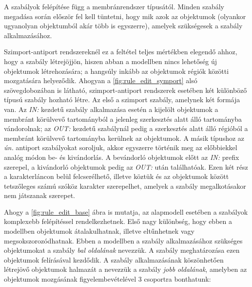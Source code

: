  A szabályok felépítése függ a membránrendszer típusától. Minden szabály megadása során először fel kell tüntetni, hogy mik azok az objektumok (olyankor ugyanolyan objektumból akár több is egyszerre), amelyek szükségesek a szabály alkalmazásához. 

Szimport-antiport rendszereknél ez a feltétel teljes mértékben elegendő ahhoz, hogy a szabály létrejöjjön, hiszen abban a modellben nincs lehetőség új objektumok létrehozására; a hangsúly inkább az objektumok régiók közötti mozgatására helyeződik. Ahogyan a \ref{fig:rule_edit_symport} alsó szövegdobozában is látható, szimport-antiport rendszerek esetében két különböző típusú szabály hozható létre. Az első a szimport szabály, amelynek két formája van. Az \textit{IN:} kezdetű szabály alkalmazása esetén a kijelölt objektumok a membránt körülvevő tartományból a jelenleg szerkesztés alatt álló tartományba vándorolnak; az \textit{OUT:} kezdetű szabálynál pedig a szerkesztés alatt álló régióból a membránt körülvevő tartományba kerülnek az objektumok. A másik típushoz az \textit{ún.} antiport szabályokat soroljuk, akkor egyszerre történik meg az előbbiekkel analóg módon be- és kivándorlás. A bevándorló objektumok előtt az \textit{IN:} prefix szerepel, a kivándorló objektumok pedig az \textit{OUT:} után találhatóak. Ezen két rész a karakterláncon belül felcserélhető, illetve köztük és az objektumok között tetszőleges számú szóköz karakter szerepelhet, amelyek a szabály megalkotásakor nem játszanak szerepet.

Ahogy a \ref{fig:rule_edit_base} ábra is mutatja, az alapmodell esetében a szabályok komplexebb felépítéssel rendelkezhetnek. Első nagy különbség, hogy ebben a modellben objektumok átalakulhatnak, illetve eltűnhetnek vagy megsokszorozódhatnak. Ebben a modellben a szabály alkalmazásához szükséges objektumokat a szabály \textit{bal oldalának} nevezzük. A szabály meghatározása ezen objektumok felírásával kezdődik. A szabály alkalmazásának köszönhetően létrejövő objektumok halmazát a nevezzük a szabály \textit{jobb oldalának}, amelyben az objektumok mozgásának figyelembevételével 3 csoportra bonthatunk:

